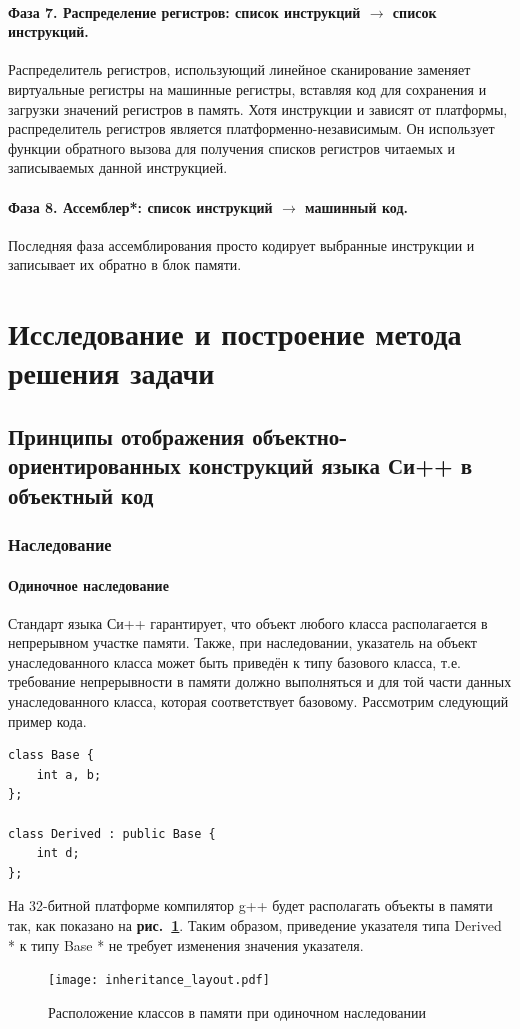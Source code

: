 \documentclass[a4paper,12pt,russian]{article}
\newcommand{\picref}[1]{\textbf{рис.~\ref{#1}}}
\newcommand{\code}[1]{\textsf{#1}}
\begin{document}
\paragraph{Фаза 7. Распределение регистров: список инструкций $\longrightarrow$ список инструкций.}
Распределитель регистров, использующий линейное сканирование заменяет виртуальные регистры на машинные регистры, вставляя код для сохранения и загрузки значений регистров в память.
Хотя инструкции и зависят от платформы, распределитель регистров является платформенно-независимым.
Он использует функции обратного вызова для получения списков регистров читаемых и записываемых данной инструкцией.

\paragraph{Фаза 8. Ассемблер*: список инструкций $\longrightarrow$ машинный код.}
Последняя фаза ассемблирования просто кодирует выбранные инструкции и записывает их обратно в блок памяти.

\newpage
\section{Исследование и построение метода решения задачи}
\subsection{Принципы отображения объектно-ориентированных конструкций языка Си++ в объектный код}
\subsubsection{Наследование}
\paragraph{Одиночное наследование}
Стандарт языка Си++ \cite{cpp_standard} гарантирует, что объект любого класса располагается в непрерывном участке памяти.
Также, при наследовании, указатель на объект унаследованного класса может быть приведён к типу базового класса, т.е. требование непрерывности в памяти должно выполняться и для той части данных унаследованного класса, которая соответствует базовому.
Рассмотрим следующий пример кода.
\begin{lstlisting}
class Base {
    int a, b;
};

class Derived : public Base {
    int d;
};
\end{lstlisting}
На 32-битной платформе компилятор g++ будет располагать объекты в памяти так, как показано на \picref{inheritance_layout_fig}. Таким образом, приведение указателя типа \code{Derived *} к типу \code{Base *} не требует изменения значения указателя.
\begin{figure}
  \center
  \texttt{[image: inheritance\_layout.pdf]}
  \hfill
  \caption{Расположение классов в памяти при одиночном наследовании}
  \label{inheritance_layout_fig}
\end{figure}
\end{document}
